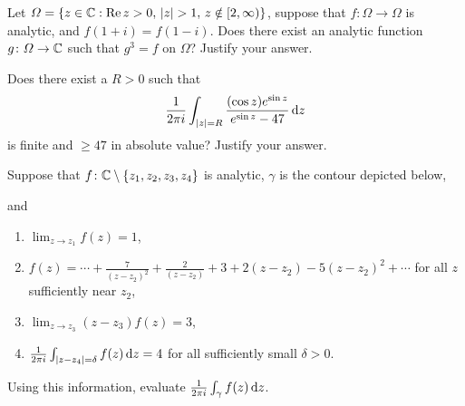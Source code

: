 \documentclass {../math135}
\begin{document}
\begin{exercise}
	Let
  \(\Omega = \{ z \in \mathbb C : \operatorname{Re} z > 0, \, \lvert z\rvert > 1, \, z \notin [2,
  \infty) \}\), suppose that \(f \colon \Omega \to \Omega\) is
  analytic, and \(f(1+i) = f(1-i)\).  Does there exist an analytic
  function \(g \colon \Omega \to \mathbb C\) such that \(g^3 = f\) on
  \(\Omega\)?  Justify your answer.

  \begin {solution}

  \end {solution}

\end{exercise}

\begin{exercise}
	Does there exist a \(R>0\) such that
	\[
    \frac 1 {2 \pi i} \int_{\lvert z\rvert = R}
    \frac {(\cos z) e^{\sin z}} {e^{\sin z} - 47} \mathop{}\!\mathrm d z
  \]
	is finite and \(\ge 47\) in absolute value?  Justify your answer.

  \begin {solution}

  \end {solution}

\end{exercise}

\begin{exercise}
	Suppose that \(f \colon \mathbb C \setminus \{z_1, z_2, z_3, z_4\}\) is
  analytic, \(\gamma\) is the contour depicted below,
  \begin {center}
  \end {center}
  and
	\begin{enumerate}
  \item \(\lim_{z \to z_1} f(z) = 1\),
  \item
    \(f(z) = \cdots + \frac 7 {(z-z_2)^2} + \frac 2 {(z-z_2)} + 3 +
    2(z-z_2) - 5 (z-z_2)^2 + \cdots\) for all \(z\) sufficiently
    near \(z_2\),
  \item \(\lim_{z \to z_3} (z-z_3) f(z) = 3\),
  \item
    \(\frac 1 {2 \pi i} \int_{\lvert z - z_4\rvert = \delta} f(z) \mathop{}\!\mathrm d z =
    4\) for all sufficiently small \(\delta > 0\).
	\end{enumerate}
	Using this information, evaluate
  \(\frac 1 {2 \pi i} \int_\gamma f(z) \mathop{}\!\mathrm d z\).

  \begin {solution}

  \end {solution}

\end{exercise}
\end{document}
